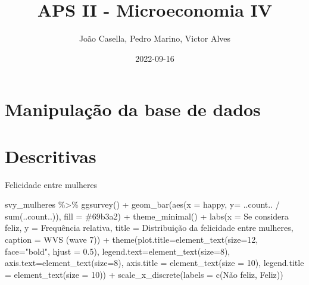 \documentclass[
]{article}
\title{APS II - Microeconomia IV}
\author{João Casella, Pedro Marino, Victor Alves}
\date{2022-09-16}
\newenvironment{Shaded}{\begin{snugshade}}{\end{snugshade}}
\newcommand{\AttributeTok}[1]{\textcolor[rgb]{0.77,0.63,0.00}{#1}}
\newcommand{\DecValTok}[1]{\textcolor[rgb]{0.00,0.00,0.81}{#1}}
\newcommand{\FloatTok}[1]{\textcolor[rgb]{0.00,0.00,0.81}{#1}}
\newcommand{\FunctionTok}[1]{\textcolor[rgb]{0.00,0.00,0.00}{#1}}
\newcommand{\NormalTok}[1]{#1}
\newcommand{\SpecialCharTok}[1]{\textcolor[rgb]{0.00,0.00,0.00}{#1}}
\newcommand{\StringTok}[1]{\textcolor[rgb]{0.31,0.60,0.02}{#1}}
\begin{document}
\maketitle

{
\setcounter{tocdepth}{2}
\tableofcontents
}
\hypertarget{manipulauxe7uxe3o-da-base-de-dados}{%
\section{Manipulação da base de
dados}\label{manipulauxe7uxe3o-da-base-de-dados}}

\hypertarget{descritivas}{%
\section{Descritivas}\label{descritivas}}

Felicidade entre mulheres

\begin{Shaded}
\begin{Highlighting}[]
\NormalTok{svy\_mulheres }\SpecialCharTok{\%\textgreater{}\%} 
  \FunctionTok{ggsurvey}\NormalTok{() }\SpecialCharTok{+}
  \FunctionTok{geom\_bar}\NormalTok{(}\FunctionTok{aes}\NormalTok{(}\AttributeTok{x =}\NormalTok{ happy, }\AttributeTok{y=}\NormalTok{ ..count.. }\SpecialCharTok{/} \FunctionTok{sum}\NormalTok{(..count..)), }\AttributeTok{fill =} \StringTok{\textquotesingle{}\#69b3a2\textquotesingle{}}\NormalTok{) }\SpecialCharTok{+}
  \FunctionTok{theme\_minimal}\NormalTok{() }\SpecialCharTok{+}
  \FunctionTok{labs}\NormalTok{(}\AttributeTok{x =} \StringTok{\textquotesingle{}Se considera feliz\textquotesingle{}}\NormalTok{,}
       \AttributeTok{y =} \StringTok{\textquotesingle{}Frequência relativa\textquotesingle{}}\NormalTok{,}
       \AttributeTok{title =} \StringTok{\textquotesingle{}Distribuição da felicidade entre mulheres\textquotesingle{}}\NormalTok{,}
       \AttributeTok{caption =} \StringTok{\textquotesingle{}WVS (wave 7)\textquotesingle{}}\NormalTok{) }\SpecialCharTok{+}
  \FunctionTok{theme}\NormalTok{(}\AttributeTok{plot.title=}\FunctionTok{element\_text}\NormalTok{(}\AttributeTok{size=}\DecValTok{12}\NormalTok{, }\AttributeTok{face=}\StringTok{"bold"}\NormalTok{, }\AttributeTok{hjust =} \FloatTok{0.5}\NormalTok{),}
        \AttributeTok{legend.text=}\FunctionTok{element\_text}\NormalTok{(}\AttributeTok{size=}\DecValTok{8}\NormalTok{),}
        \AttributeTok{axis.text=}\FunctionTok{element\_text}\NormalTok{(}\AttributeTok{size=}\DecValTok{8}\NormalTok{),}
        \AttributeTok{axis.title =} \FunctionTok{element\_text}\NormalTok{(}\AttributeTok{size =} \DecValTok{10}\NormalTok{),}
        \AttributeTok{legend.title =} \FunctionTok{element\_text}\NormalTok{(}\AttributeTok{size =} \DecValTok{10}\NormalTok{)) }\SpecialCharTok{+}
  \FunctionTok{scale\_x\_discrete}\NormalTok{(}\AttributeTok{labels =} \FunctionTok{c}\NormalTok{(}\StringTok{\textquotesingle{}Não feliz\textquotesingle{}}\NormalTok{, }\StringTok{\textquotesingle{}Feliz\textquotesingle{}}\NormalTok{))}
\end{Highlighting}
\end{Shaded}
\end{document}
